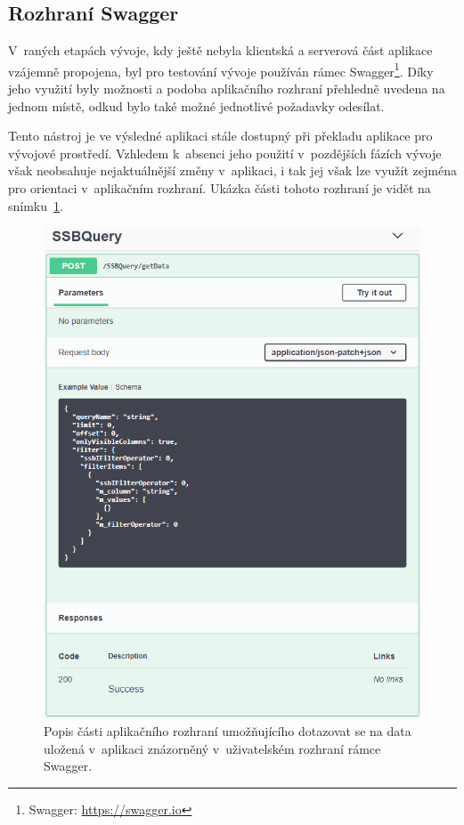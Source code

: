 \subsection{Rozhraní Swagger}
V~raných etapách vývoje, kdy ještě nebyla klientská a serverová část aplikace vzájemně propojena, byl pro testování vývoje používán rámec Swagger\footnote{Swagger: \url{https://swagger.io}}. Díky jeho využití byly možnosti a podoba aplikačního rozhraní přehledně uvedena na jednom místě, odkud bylo také možné jednotlivé požadavky odesílat.

Tento nástroj je ve výsledné aplikaci stále dostupný při překladu aplikace pro vývojové prostředí. Vzhledem k~absenci jeho použití v~pozdějších fázích vývoje však neobsahuje nejaktuálnější změny v~aplikaci, i tak jej však lze využít zejména pro orientaci v~aplikačním rozhraní. Ukázka části tohoto rozhraní je vidět na snímku~\ref{img:swagger}.

\begin{figure}[H]
	\centering
	\label{img:swagger}
	\includegraphics[width=\textwidth]{obrazky-figures/swagger.png}
	\caption{Popis části aplikačního rozhraní umožňujícího dotazovat se na data uložená v~aplikaci znázorněný v~uživatelském rozhraní rámce Swagger.}
\end{figure}

